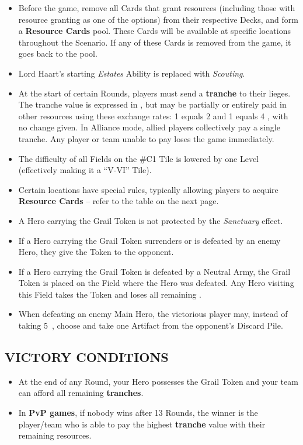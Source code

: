 \begin{multicols*}{2}
\begin{itemize}
  \item Before the game, remove all Cards that grant resources (including those with resource granting as one of the options) from their respective Decks, and form a \textbf{Resource Cards} pool. These Cards will be available at specific locations throughout the Scenario. If any of these Cards is removed from the game, it goes back to the pool.
  \item Lord Haart's starting \textit{Estates} Ability is replaced with \textit{Scouting}.
  \item At the start of certain Rounds, players must send a \textbf{tranche} to their lieges. The tranche value is expressed in , but may be partially or entirely paid in other resources using these exchange rates: 1  equals 2  and 1  equals 4 , with no change given. In Alliance mode, allied players collectively pay a single tranche. Any player or team unable to pay loses the game immediately.
  \item The difficulty of all Fields on the \#C1 Tile is lowered by one Level (effectively making it a ``V-VI'' Tile).
  \item Certain locations have special rules, typically allowing players to acquire \textbf{Resource Cards} -- refer to the table on the next page.
  \item A Hero carrying the Grail Token is not protected by the \textit{Sanctuary} effect.
  \item If a Hero carrying the Grail Token surrenders or is defeated by an enemy Hero, they give the Token to the opponent.
  \item If a Hero carrying the Grail Token is defeated by a Neutral Army, the Grail Token is placed on the Field where the Hero was defeated. Any Hero visiting this Field takes the Token and loses all remaining .
  \item When defeating an enemy Main Hero, the victorious player may, instead of taking \mbox{5 }, choose and take one Artifact from the opponent's Discard Pile.
\end{itemize}

\subsection*{\MakeUppercase{Victory Conditions}}

\begin{itemize}
  \item At the end of any Round, your Hero possesses the Grail Token and your team can afford all remaining \textbf{tranches}.
  \item In \textbf{PvP games}, if nobody wins after 13 Rounds, the winner is the player/team who is able to pay the highest \textbf{tranche} value with their remaining resources.
\end{itemize}


\end{multicols*}
